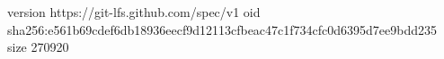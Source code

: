 version https://git-lfs.github.com/spec/v1
oid sha256:e561b69cdef6db18936eecf9d12113cfbeac47c1f734cfc0d6395d7ee9bdd235
size 270920
